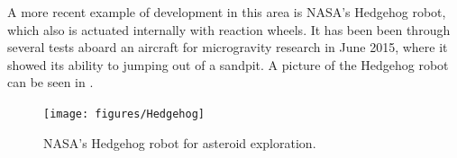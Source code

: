 %
A more recent example of development in this area is NASA's Hedgehog robot, which also is actuated internally with reaction wheels. It has been been through several tests aboard an aircraft for microgravity research in June 2015, where it showed its ability to jumping out of a sandpit. A picture of the Hedgehog robot can be seen in .\cite{ELandau}
%
\begin{figure}[H] 
	\centering
	\texttt{[image: figures/Hedgehog]}
	\caption{NASA's Hedgehog robot for asteroid exploration\cite{ELandau}.}
	\label{Hedgehog}
\end{figure}
%
